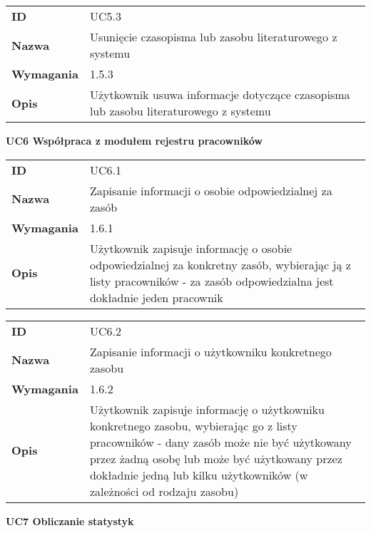 \vspace{.05\textheight}

\begin{tabular}{p{}p{}}
\hfill {\bf ID} & UC5.3 \\
\hfill {\bf Nazwa} & Usunięcie czasopisma lub zasobu literaturowego z systemu \\
\hfill {\bf Wymagania} & 1.5.3 \\
\hfill {\bf Opis} & Użytkownik usuwa informacje dotyczące czasopisma lub zasobu literaturowego z systemu \\
\end{tabular}

\vspace{.03\textheight}
\begin{center}
  {\Large\bf UC6 Współpraca z modułem rejestru pracowników}
\end{center}
\vspace{.02\textheight}

\begin{tabular}{p{}p{}}
\hfill {\bf ID} & UC6.1 \\
\hfill {\bf Nazwa} &  Zapisanie informacji o osobie odpowiedzialnej za zasób \\
\hfill {\bf Wymagania} & 1.6.1 \\
\hfill {\bf Opis} & Użytkownik zapisuje informację o osobie odpowiedzialnej za konkretny zasób, wybierając ją z listy pracowników - za zasób odpowiedzialna jest dokładnie jeden pracownik \\
\end{tabular}

\vspace{.05\textheight}

\begin{tabular}{p{}p{}}
\hfill {\bf ID} & UC6.2 \\
\hfill {\bf Nazwa} & Zapisanie informacji o użytkowniku konkretnego zasobu \\
\hfill {\bf Wymagania} & 1.6.2 \\
\hfill {\bf Opis} &  Użytkownik zapisuje informację o użytkowniku konkretnego zasobu,  wybierając go z listy pracowników - dany zasób może nie być użytkowany przez żadną osobę lub może być użytkowany przez dokładnie jedną lub kilku użytkowników (w zależności od rodzaju zasobu) \\
\end{tabular}

\vspace{.03\textheight}
\begin{center}
  {\Large\bf UC7 Obliczanie statystyk }
\end{center}
\vspace{.02\textheight}

